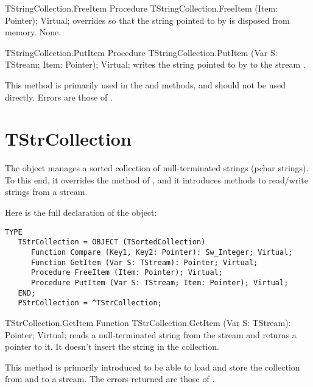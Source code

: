 \html{}

\begin{procedure}{TStringCollection.FreeItem}
\Declaration
Procedure TStringCollection.FreeItem (Item: Pointer); Virtual;
\Description
{} overrides  so that the string pointed
to by  is disposed from memory.
\Errors
None.
\SeeAlso
{}
\end{procedure}

\begin{procedure}{TStringCollection.PutItem}
\Declaration
Procedure TStringCollection.PutItem (Var S: TStream; Item: Pointer); Virtual;
\Description
{} writes the string pointed to by  to the stream
. 

This method is primarily used in the  and  methods, 
and should not be used directly.
\Errors
Errors are those of .
\SeeAlso
{}
\end{procedure}


\section{TStrCollection}
\label{se:TStrCollection}

The  object manages a sorted collection
of null-terminated strings (pchar strings).  
To this end, it overrides the 
method of , and it introduces methods to read/write
strings from a stream.

Here is the full declaration of the  object:

\begin{verbatim}
TYPE
   TStrCollection = OBJECT (TSortedCollection)
      Function Compare (Key1, Key2: Pointer): Sw_Integer; Virtual;
      Function GetItem (Var S: TStream): Pointer; Virtual;
      Procedure FreeItem (Item: Pointer); Virtual;
      Procedure PutItem (Var S: TStream; Item: Pointer); Virtual;
   END;
   PStrCollection = ^TStrCollection;
\end{verbatim}

\begin{function}{TStrCollection.GetItem}
\Declaration
Function TStrCollection.GetItem (Var S: TStream): Pointer; Virtual;
\Description
{} reads a null-terminated string from the stream  
and returns a pointer  to it. It doesn't insert the string in the 
collection.

This method is primarily introduced to be able to load and store the
collection from and to a stream.
\Errors
The errors returned are those of .
\SeeAlso
{}
\end{function}

